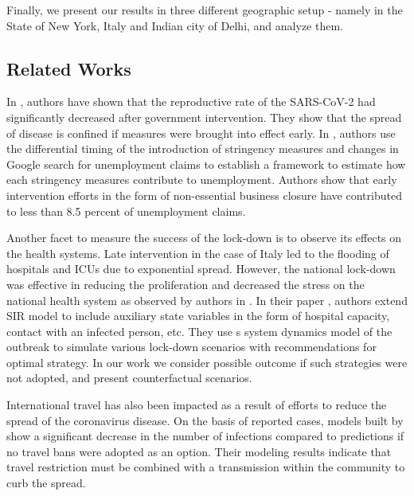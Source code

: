 \documentclass[preprint,authoryear,12pt]{elsarticle}
\begin{document}
	Finally, we present our results in three different geographic setup - namely in the State of New York, Italy and Indian city of Delhi, and analyze them. 
	
	\subsection{Related Works}
	In \cite{Koh2020}, authors have shown that the reproductive rate of the SARS-CoV-2 had significantly decreased after government intervention. They show that the spread of disease is confined if measures were brought into effect early. In \cite{KP2020}, authors use the differential timing of the introduction of stringency measures and changes in Google search for unemployment claims to establish a framework to estimate how each stringency measures contribute to unemployment. Authors show that early intervention efforts in the form of non-essential business closure have contributed to less than 8.5 percent of unemployment claims.
	
	Another facet to measure the success of the lock-down is to observe its effects on the health systems. Late intervention in the case of Italy led to the flooding of hospitals and ICUs due to exponential spread. However, the national lock-down was effective in reducing the proliferation and decreased the stress on the national health system as observed by authors in \cite{Supino2020}. In their paper \cite{IVEGA2020},  authors extend SIR model to include auxiliary state variables in the form of hospital capacity, contact with an infected person, etc. They use s system dynamics model of the outbreak to simulate various lock-down scenarios with recommendations for optimal strategy. In our work we consider possible outcome if such strategies were not adopted,  and present counterfactual scenarios.
	
	International travel has also been impacted as a result of efforts to reduce the spread of the coronavirus disease. On the basis of reported cases, models built by \cite{Chinazzi395} show a significant decrease in the number of infections compared to predictions if no travel bans were adopted as an option. Their modeling results indicate that travel restriction must be combined with a transmission within the community to curb the spread.
	
\end{document}
